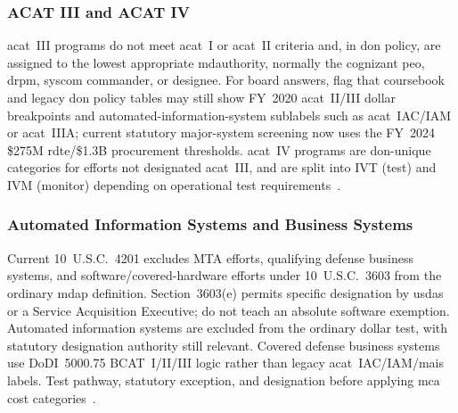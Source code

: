\documentclass[../main.tex]{subfiles}
\begin{document}
\subsubsection{ACAT III and ACAT IV}
\ac{acat}~III programs do not meet \ac{acat}~I or \ac{acat}~II criteria and, in \ac{don} policy, are assigned to the lowest appropriate \ac{mdauthority}, normally the cognizant \ac{peo}, \ac{drpm}, \ac{syscom} commander, or designee. For board answers, flag that coursebook and legacy \ac{don} policy tables may still show FY~2020 \ac{acat}~II/III dollar breakpoints and automated-information-system sublabels such as \ac{acat}~IAC/IAM or \ac{acat}~IIIA; current statutory major-system screening now uses the FY~2024 \$275M \ac{rdte}/\$1.3B procurement thresholds. \ac{acat}~IV programs are \ac{don}-unique categories for efforts not designated \ac{acat}~III, and are split into IVT (test) and IVM (monitor) depending on operational test requirements~\autocite{DoDI5000-85,edo-3-3-1-acq-policy-players-2025,SECNAV5000-2G,FY2026-NDAA}.

\subsubsection{Automated Information Systems and Business Systems}
Current 10~U.S.C.\ 4201 excludes MTA efforts, qualifying defense business systems, and software/covered-hardware efforts under 10~U.S.C.\ 3603 from the ordinary \ac{mdap} definition. Section~3603(e) permits specific designation by \ac{usdas} or a Service Acquisition Executive; do not teach an absolute software exemption. Automated information systems are excluded from the ordinary dollar test, with statutory designation authority still relevant. Covered defense business systems use DoDI~5000.75 BCAT~I/II/III logic rather than legacy \ac{acat}~IAC/IAM/\ac{mais} labels. Test pathway, statutory exception, and designation before applying \ac{mca} cost categories~\autocite{USC-10-4201-2026,USC-10-3603,DoDI5000-75}.
\end{document}
